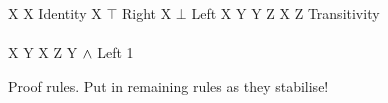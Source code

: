 \begin{FIGURE}
\begin{RULES}

  \ZEROPREMISERULENAMEDRIGHT
  {
    X \judge X
  }{Identity}
    \quad
  \ZEROPREMISERULENAMEDRIGHT
  {
    X \judge \top
  }{$\top$ Right}
    \quad
  \ZEROPREMISERULENAMEDRIGHT
  {
    \bot \judge X
  }{$\bot$ Left}
    \quad
  \TWOPREMISERULENAMEDRIGHT
  {
    X \judge Y
  }
  {
    Y \judge Z
  }
  {
    X \judge Z
  }{Transitivity}
    \\\\
  \ONEPREMISERULENAMEDRIGHT
  {
    X \judge Y
  }
  {
    X \AND Z \judge Y
  }{$\land$ Left 1}
\end{RULES}
\caption{Proof rules. Put in remaining rules as they stabilise!}\label{figure:elAndBangRules}
\end{FIGURE}

